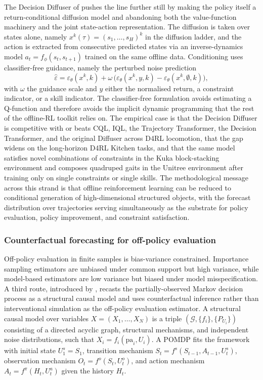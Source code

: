 The Decision Diffuser of \citet{Ajay2023} pushes the line further still by
making the policy itself a return-conditional diffusion model and abandoning
both the value-function machinery and the joint state-action representation. The
diffusion is taken over states alone, namely
$x^k(\tau) = (s_1, \dots, s_H)^k$ in the diffusion ladder, and the action is
extracted from consecutive predicted states via an inverse-dynamics model
$a_t = f_\phi(s_t, s_{t+1})$ trained on the same offline data. Conditioning uses
classifier-free guidance, namely the perturbed noise prediction
\begin{equation}
\hat\varepsilon = \varepsilon_\theta(x^k, k)
  + \omega\,\bigl(\varepsilon_\theta(x^k, y, k)
    - \varepsilon_\theta(x^k, \emptyset, k)\bigr),
\label{eq:dd_classifier_free}
\end{equation}
with $\omega$ the guidance scale and $y$ either the normalised return, a
constraint indicator, or a skill indicator. The classifier-free formulation
avoids estimating a Q-function and therefore avoids the implicit dynamic
programming that the rest of the offline-RL toolkit relies on. The empirical
case is that the Decision Diffuser is competitive with or beats CQL, IQL, the
Trajectory Transformer, the Decision Transformer, and the original Diffuser
across D4RL locomotion, that the gap widens on the long-horizon D4RL Kitchen
tasks, and that the same model satisfies novel combinations of constraints in
the Kuka block-stacking environment and composes quadruped gaits in the Unitree
environment after training only on single constraints or single skills. The
methodological message across this strand is that offline reinforcement learning
can be reduced to conditional generation of high-dimensional structured objects,
with the forecast distribution over trajectories serving simultaneously as the
substrate for policy evaluation, policy improvement, and constraint satisfaction.

\subsubsection{Counterfactual forecasting for off-policy evaluation}
\label{sec:counterfactual_ope}

Off-policy evaluation in finite samples is bias-variance constrained. Importance
sampling estimators are unbiased under common support but high variance, while
model-based estimators are low variance but biased under model misspecification.
A third route, introduced by \citet{Buesing2019}, recasts the partially-observed
Markov decision process as a structural causal model and uses counterfactual
inference rather than interventional simulation as the off-policy evaluation
estimator. A structural causal model over variables $X = (X_1, \dots, X_N)$ is
a triple $(\mathcal G, \{f_i\}, \{P_{U_i}\})$ consisting of a directed acyclic
graph, structural mechanisms, and independent noise distributions, such that
$X_i = f_i(\mathrm{pa}_i, U_i)$. A POMDP fits the framework with initial state
$U^s_1 = S_1$, transition mechanism $S_t = f^s(S_{t-1}, A_{t-1}, U^s_t)$,
observation mechanism $O_t = f^o(S_t, U^o_t)$, and action mechanism
$A_t = f^\pi(H_t, U^a_t)$ given the history $H_t$.

